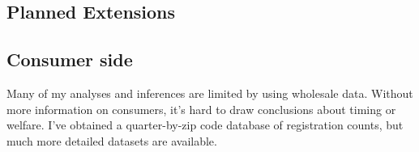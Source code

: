 \documentclass[11pt,letterpaper,oneside]{article}
\begin{document}
\begin{doublespacing}
\section{Planned Extensions}
%
%
%


\subsection{Consumer side}
Many of my analyses and inferences are limited by using wholesale data.
Without more information on consumers, it's hard to draw conclusions about timing or welfare.
I've obtained a quarter\hyp{}by\hyp{}zip code database of registration counts, but much more detailed datasets are available.
%

\end{doublespacing}
\end{document}
